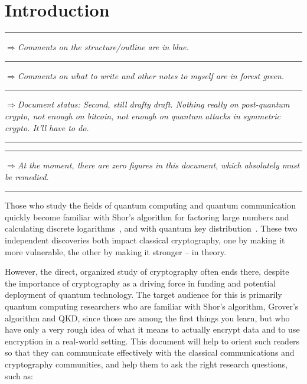 \documentclass[%
 aip,
 jmp,%
 amsmath,amssymb,
 reprint,%
]{revtex4-1}
\def\outlinecomment#1{\hrule{\color{Blue}$\Rightarrow${\small\em #1}}\hrule}
\def\comment#1{{\color{ForestGreen}$\Rightarrow${\small\em #1}}}
\begin{document}
\section{Introduction}

\outlinecomment{Comments on the structure/outline are in blue.}

\comment{Comments on what to write and other notes to myself are in
  forest green.}

\outlinecomment{Document status: Second, still drafty draft.  Nothing
  really on post-quantum crypto, not enough on bitcoin, not enough on
  quantum attacks in symmetric crypto.  It'll have to do.}
\outlinecomment{At the moment, there are zero figures in this
  document, which absolutely must be remedied.}

Those who study the fields of quantum computing and quantum
communication quickly become familiar with Shor's algorithm for
factoring large numbers and calculating discrete
logarithms~\cite{shor:siam-factor}, and with quantum key
distribution~\cite{bennett:bb84,PhysRevLett.68.557,ekert1991qcb,PhysRevLett.108.130503,xu2015measurement,Vazirani:2019:FDI:3321370.3310974,RevModPhys.81.1301,PhysRevLett.85.441}.
These two independent discoveries both impact classical cryptography,
one by making it more vulnerable, the other by making it stronger --
in theory.

However, the direct, organized study of cryptography often ends there,
despite the importance of cryptography as a driving force in funding
and potential deployment of quantum technology.  The target audience
for this is primarily quantum computing researchers who are familiar
with Shor's algorithm, Grover's algorithm and QKD, since those are
among the first things you learn, but who have only a very rough idea
of what it means to actually encrypt data and to use encryption in a
real-world setting.  This document will help to orient such readers so
that they can communicate effectively with the classical
communications and cryptography communities, and help them to ask the
right research questions, such as:
\end{document}
